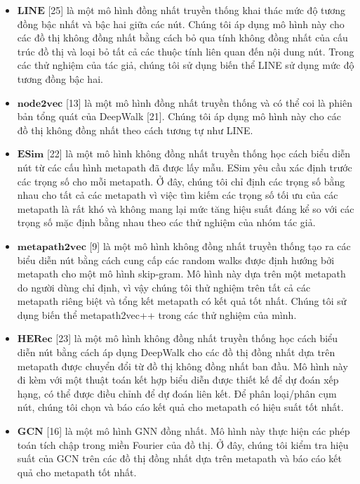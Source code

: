 \begin{table}[]
\begin{tabular}{|l|l|l|l|}
  \end{tabular}
  \end{table}

\begin{itemize}
  \item $\mathbf{LINE}$ [25] là một mô hình đồng nhất truyền thống khai thác mức độ tương đồng bậc nhất và bậc hai giữa các nút. Chúng tôi áp dụng mô hình này cho các đồ thị không đồng nhất bằng cách bỏ qua tính không đồng nhất của cấu trúc đồ thị và loại bỏ tất cả các thuộc tính liên quan đến nội dung nút. Trong các thử nghiệm của tác giả, chúng tôi sử dụng biến thể LINE sử dụng mức độ tương đồng bậc hai.
  \item $\mathbf{node2vec}$ [13] là một mô hình đồng nhất truyền thống và có thể coi là phiên bản tổng quát của DeepWalk [21]. Chúng tôi áp dụng mô hình này cho các đồ thị không đồng nhất theo cách tương tự như LINE.
  \item $\mathbf{ESim}$ [22] là một mô hình không đồng nhất truyền thống học cách biểu diễn nút từ các cấu hình metapath đã được lấy mẫu. ESim yêu cầu xác định trước các trọng số cho mỗi metapath. Ở đây, chúng tôi chỉ định các trọng số bằng nhau cho tất cả các metapath vì việc tìm kiếm  các trọng số tối ưu của các metapath là rất khó và không mang lại mức tăng hiệu suất đáng kể so với các trọng số mặc định bằng nhau theo các thử nghiệm của nhóm tác giả.
  \item $\mathbf{metapath2vec}$ [9] là một mô hình không đồng nhất truyền thống tạo ra các biểu diễn nút bằng cách cung cấp các random walks được định hướng bởi metapath cho một mô hình skip-gram. Mô hình này dựa trên một metapath do người dùng chỉ định, vì vậy chúng tôi thử nghiệm trên tất cả các metapath riêng biệt và tổng kết metapath có kết quả tốt nhất. Chúng tôi sử dụng biến thể metapath2vec++ trong các thử nghiệm của mình. 
  \item $\mathbf{HERec}$ [23] là một mô hình không đồng nhất truyền thống học cách biểu diễn nút bằng cách áp dụng DeepWalk cho các đồ thị đồng nhất dựa trên metapath được chuyển đổi từ đồ thị không đồng nhất ban đầu. Mô hình này đi kèm với một thuật toán kết hợp biểu diễn được thiết kế để dự đoán xếp hạng, có thể được điều chỉnh để dự đoán liên kết. Để phân loại/phân cụm nút, chúng tôi chọn và báo cáo kết quả cho metapath có hiệu suất tốt nhất.
  \item $\mathbf{GCN}$ [16] là một mô hình GNN đồng nhất. Mô hình này thực hiện các phép toán tích chập trong miền Fourier của đồ thị. Ở đây, chúng tôi kiểm tra hiệu suất của GCN trên các đồ thị đồng nhất dựa trên metapath và báo cáo kết quả cho metapath tốt nhất.

\end{itemize}
